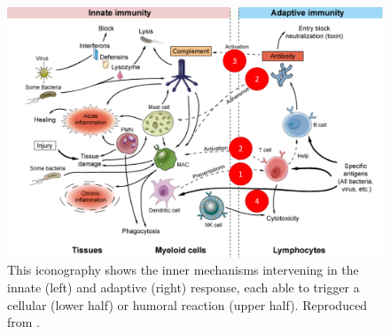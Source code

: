 \begin{figure}
    \centering
    \includegraphics[scale=0.3]{figures/innate-adaptive-cooperation.png}
    \caption[Cooperation mechanisms between the innate and the adaptive immunity]{
    This iconography shows the inner mechanisms intervening in the innate (left) and adaptive (right) response, each able to trigger a cellular (lower half) or humoral reaction (upper half). Reproduced from \autocite[Fig .1]{cdcreativediagnostics20}.}
        \label{fig:innate-adaptive-cooperation}
\end{figure}
    
